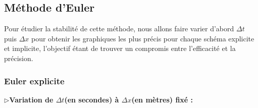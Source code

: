 \subsection{Méthode d'Euler}

Pour étudier la stabilité de cette méthode, nous allons faire varier d'abord  $\Delta t$  puis $\Delta x$ pour obtenir les graphiques les plus précis pour chaque schéma explicite et implicite, l'objectif étant de trouver un compromis entre l'efficacité et la précision.

\subsubsection{Euler explicite}

$\triangleright$\textbf{Variation de  $\Delta t$(en secondes) à $\Delta x$(en mètres) fixé :}\\

